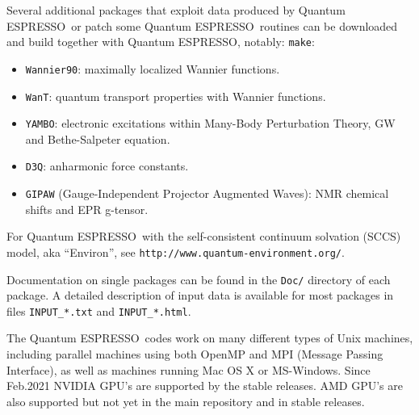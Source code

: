 \documentclass[12pt,a4paper]{article}
\def\qe{{\sc Quantum ESPRESSO}}
\def\make{\texttt{make}}
\begin{document}
Several additional packages that exploit data produced by \qe\
or patch some \qe\ routines can be downloaded and build together with \qe,
notably:
\make:
\begin{itemize}
\item \texttt{Wannier90}:
      maximally localized Wannier functions.
\item \texttt{WanT}:
      quantum transport properties with Wannier functions.
\item \texttt{YAMBO}:
      electronic excitations within Many-Body Perturbation Theory,
      GW and Bethe-Salpeter equation.
\item \texttt{D3Q}:
      anharmonic force constants.
\item \texttt{GIPAW} (Gauge-Independent Projector Augmented Waves):
      NMR chemical shifts and EPR g-tensor.
\end{itemize}
For \qe\ with the self-consistent continuum solvation (SCCS) model,
aka ``Environ'', see \texttt{http://www.quantum-environment.org/}.

Documentation on single packages can be found in the \texttt{Doc/}
directory of each package. A detailed description of input
data is available for most packages in files \texttt{INPUT\_*.txt} and
\texttt{INPUT\_*.html}.

The \qe\ codes work on many different types of Unix machines,
including parallel machines using both OpenMP and MPI
(Message Passing Interface), as well as machines running
Mac OS X or MS-Windows.
Since Feb.2021 NVIDIA GPU's are supported by the stable releases.
AMD GPU's are also supported but not yet in the main repository
and in stable releases.
\end{document}
